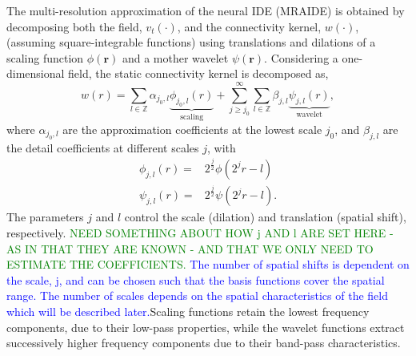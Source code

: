 \documentclass[11pt,draftcls,onecolumn,peerreview]{IEEEtran}
\newcommand{\dean}[1]{\textcolor{green}{#1}}
\newcommand{\parham}[1]{\textcolor{blue}{#1}}
\begin{document}
The multi-resolution approximation \cite{Mallat1989a} of the neural IDE (MRAIDE) is obtained by decomposing both the field, $v_t(\cdot)$, and the connectivity kernel, $w(\cdot)$, (assuming square-integrable functions) using translations and dilations of a scaling function $\phi(\mathbf{r})$ and a mother wavelet $\psi(\mathbf{r})$. Considering a  one-dimensional field, the static connectivity kernel is decomposed as,
\begin{equation}
 w\left(r\right)=\sum_{l\in \mathbb{Z}}\alpha_{j_0,l} \underbrace{\phi_{j_0,l}\left(r\right)}_{\text{scaling}} + \sum_{j\geq j_0}^{\infty} \sum_{l \in \mathbb{Z}}\beta_{j,l} \underbrace{\psi_{j,l}\left(r\right)}_{\text{wavelet}}, 
\label{eq:KernelExpansion}
\end{equation}
where $\alpha_{j_0,l}$ are the approximation coefficients at the lowest scale $j_0$, and $\beta_{j,l}$ are the detail coefficients at different scales $j$, with
\begin{align}
\phi_{j,l}\left(r\right) =& 2^{\frac{j}{2}}\phi\left(2^j r-l\right) \\	
\psi_{j,l}\left(r\right) =& 2^{\frac{j}{2}}\psi\left(2^j r-l\right).
\end{align}
The parameters $j$ and $l$ control the scale (dilation) and translation (spatial shift), respectively. \dean{NEED SOMETHING ABOUT HOW j AND l ARE SET HERE - AS IN THAT THEY ARE KNOWN - AND THAT WE ONLY NEED TO ESTIMATE THE COEFFICIENTS.} \parham{The number of spatial shifts is dependent on the scale, j, and can be chosen such that the basis functions cover the spatial range. The number of scales depends on the spatial characteristics of the field which will be described later.}Scaling functions retain the lowest frequency components, due to their low-pass properties, while the wavelet functions extract successively higher frequency components due to their band-pass characteristics. 

\end{document}
